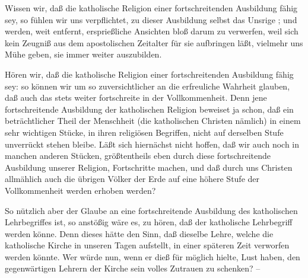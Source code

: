 \begin{aufza}
\begin{aufzb}
\item Wissen wir, daß die katholische Religion einer fortschreitenden Ausbildung fähig sey, so fühlen wir uns verpflichtet, zu dieser Ausbildung selbst das Unsrige ; und werden, weit entfernt, ersprießliche Ansichten bloß darum zu verwerfen, weil sich kein Zeugniß aus dem apostolischen Zeitalter für sie aufbringen läßt, vielmehr uns Mühe geben, sie immer weiter auszubilden.
\item Hören wir, daß die katholische Religion einer fortschreitenden Ausbildung fähig sey: so können wir um so zuversichtlicher an die erfreuliche Wahrheit glauben, daß auch das  stets weiter fortschreite in der Vollkommenheit. Denn jene fortschreitende Ausbildung der katholischen Religion beweiset ja schon, daß ein beträchtlicher Theil der Menschheit (die katholischen Christen nämlich) in einem sehr wichtigen Stücke, in ihren religiösen Begriffen, nicht auf derselben Stufe unverrückt stehen bleibe. Läßt sich hiernächst nicht hoffen, daß wir auch noch in manchen anderen Stücken, größtentheils eben durch diese fortschreitende Ausbildung unserer Religion, Fortschritte machen, und daß durch uns Christen allmählich auch die übrigen Völker der Erde auf eine höhere Stufe der Vollkommenheit werden erhoben werden?
\end{aufzb}
\item So nützlich aber der Glaube an eine fortschreitende Ausbildung des katholischen Lehrbegriffes ist, so anstößig wäre es, zu hören, daß der katholische Lehrbegriff  werden könne. Denn dieses hätte den Sinn, daß dieselbe Lehre, welche die katholische Kirche in unseren Tagen aufstellt, in einer späteren Zeit verworfen werden könnte. Wer würde nun, wenn er dieß für möglich hielte, Lust haben, den gegenwärtigen Lehrern der Kirche sein volles Zutrauen zu schenken? --
\end{aufza}

